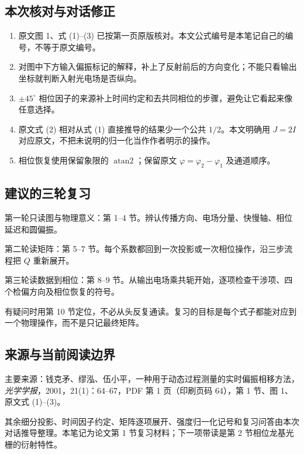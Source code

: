 \documentclass[UTF8,fontset=fandol,11pt,a4paper]{ctexart}
\begin{document}
\subsection{本次核对与对话修正}
\begin{enumerate}
\item 原文图 1、式 (1)--(3) 已按第一页原版核对。本文公式编号是本笔记自己的编号，不等于原文编号。
\item 对图中下方输入偏振标记的解释，补上了反射前后的方向变化；不能只看输出坐标就判断入射光电场是否纵向。
\item $\pm45^\circ$ 相位因子的来源补上时间约定和去共同相位的步骤，避免让它看起来像任意选择。
\item 原文式 (2) 相对从式 (1) 直接推导的结果少一个公共 $1/2$。本文明确用 $J=2I$ 对应原文，不把未说明的归一化当作作者明示的操作。
\item 相位恢复使用保留象限的 $\operatorname{atan2}$；保留原文 $\varphi=\varphi_2-\varphi_1$ 及通道顺序。
\end{enumerate}

\subsection{建议的三轮复习}
第一轮只读图与物理意义：第 1--4 节。辨认传播方向、电场分量、快慢轴、相位延迟和圆偏振。

第二轮读矩阵：第 5--7 节。每个系数都回到一次投影或一次相位操作，沿三步流程把 $Q$ 重新展开。

第三轮读数据到相位：第 8--9 节。从输出电场乘共轭开始，逐项检查干涉项、四个检偏方向及相位恢复的符号。

有疑问时用第 10 节定位，不必从头反复通读。复习的目标是每个式子都能对应到一个物理操作，而不是只记最终矩阵。

\subsection{来源与当前阅读边界}
主要来源：钱克矛、缪泓、伍小平，一种用于动态过程测量的实时偏振相移方法，\textit{光学学报}，2001，21(1)：64--67，PDF 第 1 页（印刷页码 64），第 1 节、图 1、原文式 (1)--(3)。

其余细分投影、时间因子约定、矩阵逐项展开、强度归一化记号和复习问答由本次对话推导整理。本笔记为论文第 1 节复习材料；下一项带读是第 2 节相位龙基光栅的衍射特性。

\clearpage
\end{document}
